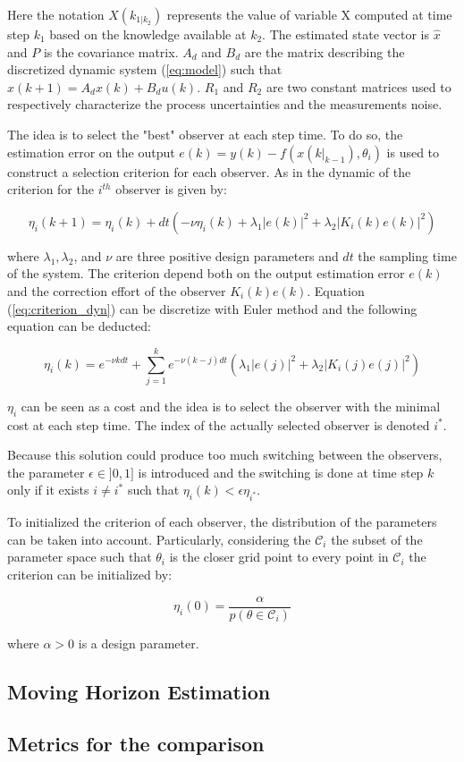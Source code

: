 Here the notation $X(k_{1|k_2})$ represents the value of variable X computed at time step $k_1$ based on the knowledge available at $k_2$. The estimated state vector is $\hat{x}$ and $P$ is the covariance matrix. $A_d$ and $B_d$ are the matrix describing the discretized dynamic system (\ref{eq:model}) such that $x(k+1) = A_dx(k) + B_d u(k)$. $R_1$ and $R_2$ are two constant matrices used to respectively characterize the process uncertainties and the measurements noise.
\medskip


The idea is to select the "best" observer at each step time. To do so, the estimation error on the output $e(k) = y(k) - f(x(k|_{k-1}), \theta_i)$ is used to construct a selection criterion for each observer. As in \cite{petriImprovingEstimationPerformance2022} the dynamic of the criterion for the $i^{th}$ observer is given by:

\begin{equation}
\eta_i (k+1) = \eta_i (k) + dt \left(- \nu \eta_i(k) + \lambda_1 |e(k)|^2 + \lambda_2 |K_i(k) e(k)|^2 \right)
\label{eq:criterion_dyn}
\end{equation}

where $\lambda_1, \lambda_2$, and $\nu$ are three positive design parameters and $dt$ the sampling time of the system. The criterion depend both on the output estimation error $e(k)$ and the correction effort of the observer $K_i(k) e(k)$. Equation (\ref{eq:criterion_dyn}) can be discretize with Euler method and the following equation can be deducted:

\begin{equation}
\eta_i(k) = e^{-\nu k dt} + \sum_{j=1}^{k} e^{-\nu(k-j)dt} (\lambda_1 |e(j)|^2 + \lambda_2 |K_i(j) e(j)|^2 )
\end{equation} 

$\eta_i$ can be seen as a cost and the idea is to select the observer with the minimal cost at each step time. The index of the actually selected observer is denoted $i^*$.

\medskip
Because this solution could produce too much switching between the observers, the parameter $\epsilon \in ]0,1]$ is introduced and the switching is done at time step $k$ only if it exists $i\neq i^*$ such that $\eta_i(k)<\epsilon \eta_{i^*}$.
\medskip

To initialized the criterion of each observer, the distribution of the parameters can be taken into account. Particularly, considering the $\mathcal{C}_i$ the subset of the parameter space such that $\theta_i$ is the closer grid point to every point in $\mathcal{C}_i$ the criterion can be initialized by:

\begin{equation}
\eta_i(0) = \frac{\alpha}{p(\theta \in \mathcal{C}_i)}
\end{equation}

where $\alpha >0$ is a design parameter.



\subsection{Moving Horizon Estimation}

\subsection{Metrics for the comparison}
